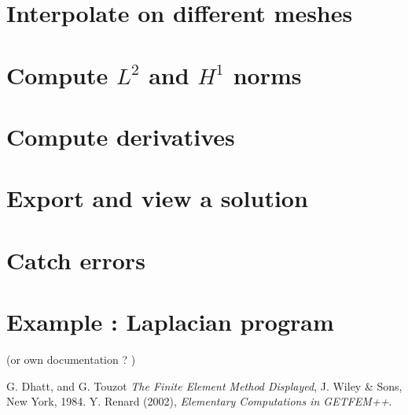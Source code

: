 \documentclass[11pt,a4paper]{article}
\begin{document}
\section{Interpolate on different meshes}

\section{Compute $L^2$ and $H^1$ norms}

\section{Compute derivatives}

\section{Export and view a solution}

\section{Catch errors}

\section{Example : Laplacian program} (or own documentation ? )


\begin{thebibliography}{99}
% 
% 
% 
  G. {\sc Dhatt, and  G. Touzot}
  {\it The Finite Element Method Displayed}, 
 J. Wiley \& Sons,  New York, 1984.
  Y. {\sc Renard} (2002),
  {\it Elementary Computations in GETFEM++}.
\end{thebibliography}
\end{document}
